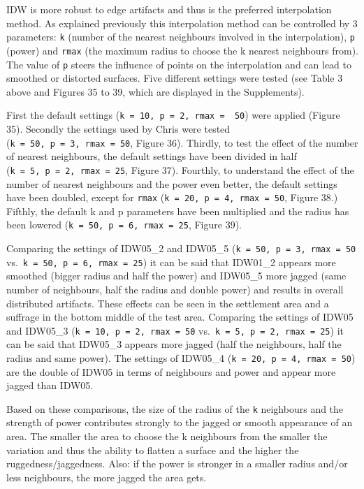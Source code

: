 \documentclass[
  12pt,
]{article}
\begin{document}
IDW is more robust to edge artifacts and thus is the preferred interpolation method. As explained previously this interpolation method can be controlled by 3 parameters: \texttt{k} (number of the nearest neighbours involved in the interpolation), \texttt{p} (power) and \texttt{rmax} (the maximum radius to choose the k nearest neighbours from). The value of \texttt{p} steers the influence of points on the interpolation and can lead to smoothed or distorted surfaces. Five different settings were tested (see Table 3 above and Figures 35 to 39, which are displayed in the Supplements).

First the default settings (\texttt{k\ =\ 10,\ p\ =\ 2,\ rmax\ =\ \ 50}) were applied (Figure 35).
Secondly the settings used by Chris were tested (\texttt{k\ =\ 50,\ p\ =\ 3,\ rmax\ =\ 50}, Figure 36).
Thirdly, to test the effect of the number of nearest neighbours, the default settings have been divided in half (\texttt{k\ =\ 5,\ p\ =\ 2,\ rmax\ =\ 25}, Figure 37).
Fourthly, to understand the effect of the number of nearest neighbours and the power even better, the default settings have been doubled, except for \texttt{rmax} (\texttt{k\ =\ 20,\ p\ =\ 4,\ rmax\ =\ 50}, Figure 38.)
Fifthly, the default k and p parameters have been multiplied and the radius has been lowered (\texttt{k\ =\ 50,\ p\ =\ 6,\ rmax\ =\ 25}, Figure 39).

Comparing the settings of IDW05\_2 and IDW05\_5 (\texttt{k\ =\ 50,\ p\ =\ 3,\ rmax\ =\ 50} vs.~\texttt{k\ =\ 50,\ p\ =\ 6,\ rmax\ =\ 25}) it can be said that IDW01\_2 appears more smoothed (bigger radius and half the power) and IDW05\_5 more jagged (same number of neighbours, half the radius and double power) and results in overall distributed artifacts. These effects can be seen in the settlement area and a suffrage in the bottom middle of the test area.
Comparing the settings of IDW05 and IDW05\_3 (\texttt{k\ =\ 10,\ p\ =\ 2,\ rmax\ =\ 50} vs.~\texttt{k\ =\ 5,\ p\ =\ 2,\ rmax\ =\ 25}) it can be said that IDW05\_3 appears more jagged (half the neighbours, half the radius and same power).
The settings of IDW05\_4 (\texttt{k\ =\ 20,\ p\ =\ 4,\ rmax\ =\ 50}) are the double of IDW05 in terms of neighbours and power and appear more jagged than IDW05.

Based on these comparisons, the size of the radius of the \texttt{k} neighbours and the strength of power contributes strongly to the jagged or smooth appearance of an area. The smaller the area to choose the k neighbours from the smaller the variation and thus the ability to flatten a surface and the higher the ruggedness/jaggedness. Also: if the power is stronger in a smaller radius and/or less neighbours, the more jagged the area gets.
\end{document}
